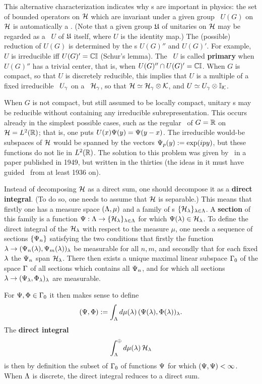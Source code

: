 This alternative characterization indicates why \vNa s are important
in physics: the set of bounded operators on ${\cal H}$ which are invariant
under a given group \rep\ $U(G)$ on ${\cal H}$ is automatically a
\vNa. (Note that a given group ${\frak U}$ of unitaries on ${\cal H}$ may be
regarded as a \rep\ $U$ of ${\frak U}$ itself, where $U$ is the identity
map.)   The (possible) reduction
of $U(G)$ is determined by the \vNa s $U(G)''$ and $U(G)'$.  For
example, $U$ is irreducible iff $U(G)'={\Bbb C}{\Bbb I}$ (Schur's lemma).  The
\rep\ $U$ is called {\bf primary} when $U(G)''$ has a trivial center,
that is, when $U(G)''\cap U(G)'={\Bbb C}{\Bbb I}$. When $G$ is compact, so that
$U$ is discretely reducible, this implies that $U$ is a multiple of a
fixed irreducible \rep\ $U_{\gamma}$ on a \Hs\ ${\cal H}_{\gamma}$, so that
${\cal H}\simeq {\cal H}_{\gamma}\otimes {\cal K}$, and $U\simeq U_{\gamma}\otimes{\Bbb I}_{{\cal K}}$.

When $G$ is not compact, but still assumed to be locally compact,
unitary \rep s may be reducible without containing any irreducible
subrepresentation. This occurs already in the simplest possible cases,
such as the regular \rep\ of $G={\Bbb R}$ on ${\cal H}=L^2({\Bbb R})$; that is, one puts
$U(x)\Psi(y)=\Psi(y-x)$. The irreducible would-be subspaces of ${\cal H}$
would be spanned by the vectors $\Psi_p(y):=\exp(ipy)$, but these
functions do not lie in $L^2({\Bbb R})$. The solution to this problem was
given by \vN\ in a paper published in 1949, but written in the
thirties (the ideas in it must have guided \vN\ from at least 1936
on).

Instead of decomposing ${\cal H}$ as a direct sum, one should decompose it
as a {\bf direct integral}. (To do so, one needs to assume that ${\cal H}$
is separable.) This means that firstly one has a measure space
$(\Lambda,\mu)$ and a family of \Hs s $\{{\cal H}_{\lambda}\}_{\lambda\in\Lambda}$. A {\bf
section} of this family is a function $\Psi:\Lambda\rightarrow
\{{\cal H}_{\lambda}\}_{\lambda\in\Lambda}$ for which $\Psi(\lambda)\in {\cal H}_{\lambda}$. To define
the direct integral of the ${\cal H}_{\lambda}$ with respect to the measure
$\mu$, one needs a sequence of sections $\{\Psi_n\}$ satisfying the two
conditions that firstly the function $\lambda\rightarrow
(\Psi_n(\lambda),\Psi_m(\lambda))_{\lambda}$ be measurable for all $n,m$, and
secondly that for each fixed $\lambda$ the $\Psi_n$ span ${\cal H}_{\lambda}$.  There
then exists a unique maximal linear subspace $\Gamma_0$ of the space
$\Gamma$ of all sections which contains all $\Psi_n$, and for which all
sections $\lambda\rightarrow (\Psi_{\lambda},\Phi_{\lambda})_{\lambda}$ are measurable.
 
For $\Psi,\Phi\in\Gamma_0$ it then makes sense to define
$$
(\Psi,\Phi):=\int_{\Lambda}d\mu(\lambda)\, (\Psi(\lambda),\Phi(\lambda))_{\lambda}.
$$
The {\bf direct integral}
$$
\int_{\Lambda}^{\oplus}d\mu(\lambda)\, {\cal H}_{\lambda}
$$
is then by definition the subset of $\Gamma_0$ of functions $\Psi$ for
 which $(\Psi,\Psi)<\infty$. When $\Lambda$ is discrete, the direct integral
 reduces to a direct sum.

